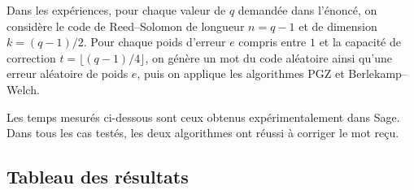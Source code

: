\documentclass[a4paper,11pt]{article}
\begin{document}
Dans les expériences, pour chaque valeur de $q$ demandée dans l'énoncé, on considère le code de Reed--Solomon de longueur $n=q-1$ et de dimension $k=(q-1)/2$. Pour chaque poids d'erreur $e$ compris entre $1$ et la capacité de correction $t=\lfloor (q-1)/4 \rfloor$, on génère un mot du code aléatoire ainsi qu'une erreur aléatoire de poids $e$, puis on applique les algorithmes PGZ et Berlekamp--Welch.

Les temps mesurés ci-dessous sont ceux obtenus expérimentalement dans Sage. Dans tous les cas testés, les deux algorithmes ont réussi à corriger le mot reçu.

\subsection{Tableau des résultats}
\end{document}

